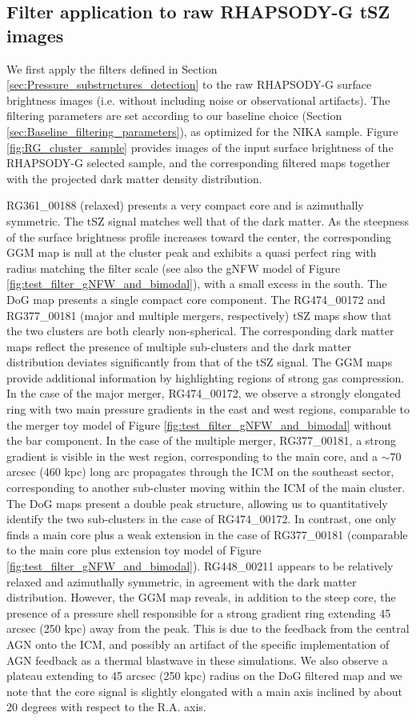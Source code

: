 \documentclass[twocolumn,traditabstract]{aa}
\begin{document}
\subsection{Filter application to raw RHAPSODY-G tSZ images}
We first apply the filters defined in Section \ref{sec:Pressure_substructures_detection} to the raw RHAPSODY-G surface brightness images (i.e. without including noise or observational artifacts). The filtering parameters are set according to our baseline choice (Section \ref{sec:Baseline_filtering_parameters}), as optimized for the NIKA sample. Figure \ref{fig:RG_cluster_sample} provides images of the input surface brightness of the RHAPSODY-G selected sample, and the corresponding filtered maps together with the projected dark matter density distribution. 

RG361\_00188 (relaxed) presents a very compact core and is azimuthally symmetric. The tSZ signal matches well that of the dark matter. As the steepness of the surface brightness profile increases toward the center, the corresponding GGM map is null at the cluster peak and exhibits a quasi perfect ring with radius matching the filter scale (see also the gNFW model of Figure \ref{fig:test_filter_gNFW_and_bimodal}), with a small excess in the south. The DoG map presents a single compact core component. The RG474\_00172 and RG377\_00181 (major and multiple mergers, respectively) tSZ maps show that the two clusters are both clearly non-spherical. The corresponding dark matter maps reflect the presence of multiple sub-clusters and the dark matter distribution deviates significantly from that of the tSZ signal. The GGM maps provide additional information by highlighting regions of strong gas compression. In the case of the major merger, RG474\_00172, we observe a strongly elongated ring with two main pressure gradients in the east and west regions, comparable to the merger toy model of Figure \ref{fig:test_filter_gNFW_and_bimodal} without the bar component. In the case of the multiple merger, RG377\_00181, a strong gradient is visible in the west region, corresponding to the main core, and a $\sim 70$ arcsec (460 kpc) long arc propagates through the ICM on the southeast sector, corresponding to another sub-cluster moving within the ICM of the main cluster. The DoG maps present a double peak structure, allowing us to quantitatively identify the two sub-clusters in the case of RG474\_00172. In contrast, one only finds a main core plus a weak extension in the case of RG377\_00181 (comparable to the main core plus extension toy model of Figure \ref{fig:test_filter_gNFW_and_bimodal}). RG448\_00211 appears to be relatively relaxed and azimuthally symmetric, in agreement with the dark matter distribution. However, the GGM map reveals, in addition to the steep core, the presence of a pressure shell responsible for a strong gradient ring extending 45 arcsec (250 kpc) away from the peak. This is due to the feedback from the central AGN onto the ICM, and possibly an artifact of the specific implementation of AGN feedback as a thermal blastwave in these simulations. We also observe a plateau extending to 45 arcsec (250 kpc) radius on the DoG filtered map and we note that the core signal is slightly elongated with a main axis inclined by about 20 degrees with respect to the R.A. axis.
\end{document}
